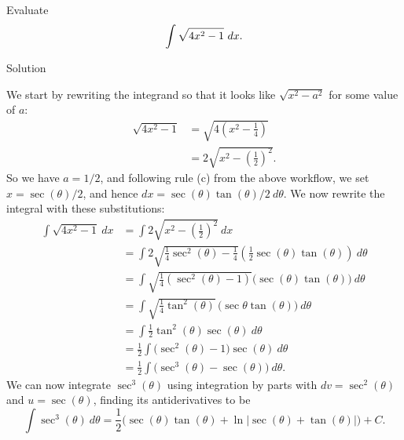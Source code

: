 \begin{example}\label{ex_trigsub2}
Evaluate $$\displaystyle \int \sqrt{4x^2-1}\ dx.$$

Solution 

We start by rewriting the integrand so that it looks like $\sqrt{x^2-a^2}$ for some value of $a$:
\begin{align*}
\sqrt{4x^2-1} &= \sqrt{4\left(x^2-\frac14\right)}\\[0.2cm]
		&= 2\sqrt{x^2-\left(\frac12\right)^2}.
\end{align*}
So we have $a=1/2$, and following rule (c) from the above workflow, we set $x= \sec(\theta)/2$, and hence $dx = \sec(\theta)\tan(\theta)/2\ d\theta$. %
We now rewrite the integral with these substitutions:
\begin{align*}
\int \sqrt{4x^2-1}\ dx &= \int 2\sqrt{x^2-\left(\frac12\right)^2}\ dx\\[0.2cm]
			&= \int 2\sqrt{\frac14\sec^2(\theta) - \frac14}\left(\frac12\sec(\theta)\tan(\theta)\right)\ d\theta\\[0.2cm]
			&=\int \sqrt{\frac14(\sec^2(\theta)-1)}\Big(\sec(\theta)\tan(\theta)\Big)\ d\theta\\[0.2cm]
			&=\int\sqrt{\frac14\tan^2(\theta)}\,\Big(\sec\theta\tan(\theta)\Big)\ d\theta\\[0.2cm]
			&=\int \frac12\tan^2(\theta)\sec(\theta)\ d\theta\\[0.2cm]
			&=\frac12\int \Big(\sec^2(\theta)-1\Big)\sec(\theta)\ d\theta\\
			&=\frac12\int \big(\sec^3(\theta) - \sec(\theta)\big)\ d\theta.
\end{align*}
We can now integrate $\sec^3(\theta)$ using integration by parts with $dv=\sec^2(\theta)$ and $u=\sec(\theta)$, finding its antiderivatives to be
$$\int \sec^3(\theta)\ d\theta = \frac12\Big(\sec(\theta)\tan(\theta) + \ln\left|\sec(\theta)+\tan(\theta)\right|\Big)+C.$$


\end{example}
